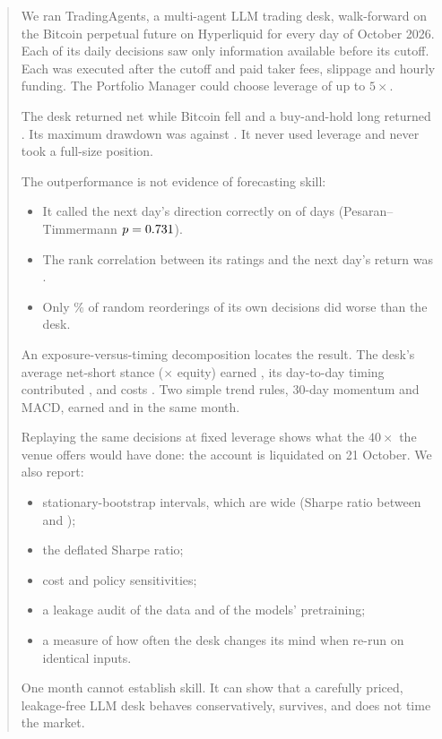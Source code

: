\begin{abstract}
We ran TradingAgents, a multi-agent LLM trading desk, walk-forward on the Bitcoin perpetual future on Hyperliquid for every day of October 2026. Each of its \Decisions{} daily decisions saw only information available before its cutoff. Each was executed after the cutoff and paid taker fees, slippage and hourly funding. The Portfolio Manager could choose leverage of up to $5\times$.

The desk returned \AgentRet{} net while Bitcoin fell \BTCWindow{} and a buy-and-hold long returned \BHRet{}. Its maximum drawdown was \AgentMDD{} against \BHMDD{}. It never used leverage and never took a full-size position.

The outperformance is not evidence of forecasting skill:
\begin{itemize}
\item It called the next day's direction correctly on \DirHits{} of \DirN{} days (Pesaran--Timmermann $p=\PTp$).
\item The rank correlation between its ratings and the next day's return was \IC{}.
\item Only \MCpct{}\% of random reorderings of its own decisions did worse than the desk.
\end{itemize}
An exposure-versus-timing decomposition locates the result. The desk's average net-short stance (\MeanSignedExp{}$\times$ equity) earned \AttrStatic{}, its day-to-day timing contributed \AttrActive{}, and costs \AttrCosts{}. Two simple trend rules, 30-day momentum and MACD, earned \TSMOMRet{} and \MACDRet{} in the same month.

Replaying the same decisions at fixed leverage shows what the $40\times$ the venue offers would have done: the account is liquidated on 21 October. We also report:
\begin{itemize}
\item stationary-bootstrap intervals, which are wide (Sharpe ratio between \SharpeLo{} and \SharpeHi{});
\item the deflated Sharpe ratio;
\item cost and policy sensitivities;
\item a leakage audit of the data and of the models' pretraining;
\item a measure of how often the desk changes its mind when re-run on identical inputs.
\end{itemize}
One month cannot establish skill. It can show that a carefully priced, leakage-free LLM desk behaves conservatively, survives, and does not time the market.
\end{abstract}
